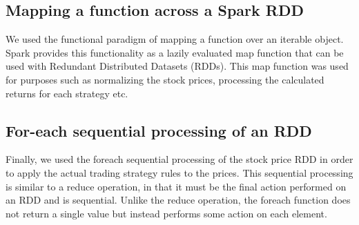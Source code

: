 \documentclass[10pt, conference, compsocconf]{IEEEtran}
\begin{document}
\subsection{Mapping a function across a Spark RDD}
We used the functional paradigm of mapping a function over an iterable object. Spark provides this functionality as a lazily evaluated map function that can be used with Redundant Distributed Datasets (RDDs). This map function was used for purposes such as normalizing the stock prices, processing the calculated returns for each strategy etc.

\subsection{For-each sequential processing of an RDD}
Finally, we used the foreach sequential processing of the stock price RDD in order to apply the actual trading strategy rules to the prices. This sequential processing is similar to a reduce operation, in that it must be the final action performed on an RDD and is sequential. Unlike the reduce operation, the foreach function does not return a single value but instead performs some action on each element.
 
\end{document}
